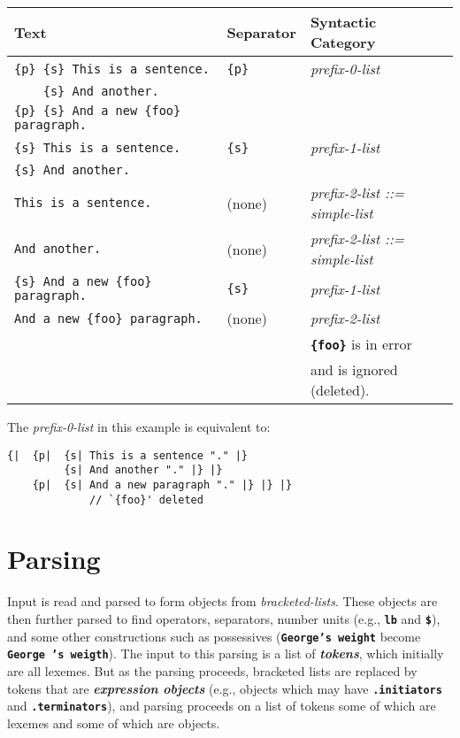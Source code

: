 \documentclass[12pt]{article}
\newcommand{\TT}[1]{{\tt \bfseries #1}}
\newcommand{\skey}[2]{{\bf \em #1#2}\index{#1}}
\newenvironment{indpar}[1][0.3in]%
	{\begin{list}{}%
		     {\setlength{\itemsep}{0in}%
		      \setlength{\topsep}{0in}%
		      \setlength{\parsep}{1ex}%
		      \setlength{\labelwidth}{#1}%
		      \setlength{\leftmargin}{#1}%
		      \addtolength{\leftmargin}{\labelsep}}%
	 \item}%
	{\end{list}}
\begin{document}
\begin{tabular}{lll}
Text	& Separator &  Syntactic Category
\\\hline
\tt \{p\} \{s\} This is a sentence.	& \tt \{p\} & \em prefix-0-list \\
\tt ~~~ \{s\} And another. \\
\tt \{p\} \{s\} And a new \{foo\} paragraph.
\\\hline
\tt \{s\} This is a sentence.	& \tt \{s\} & \em prefix-1-list \\
\tt \{s\} And another.
\\\hline
\tt This is a sentence.	& (none) & \em prefix-2-list  \rm ::= \em simple-list
\\\hline
\tt And another. & (none) & \em prefix-2-list \rm ::= \em simple-list
\\\hline
\tt \{s\} And a new \{foo\} paragraph. & \tt \{s\} & \em prefix-1-list
\\\hline
\tt And a new \{foo\} paragraph. & (none) & \em prefix-2-list \\
			       &        & \TT{\{foo\}} is in error \\
			       &        & and is ignored (deleted).
\end{tabular}

The {\em prefix-0-list} in this example is equivalent to:
\begin{indpar}\begin{verbatim}
{|  {p|  {s| This is a sentence "." |}
         {s| And another "." |} |}
    {p|  {s| And a new paragraph "." |} |} |}
             // `{foo}' deleted
\end{verbatim}\end{indpar}

\section{Parsing}
\label{PARSING}

Input is read and parsed to form objects from {\em bracketed-lists}.
These objects are then further parsed to find operators, separators,
number units (e.g., \TT{lb} and \TT{\$}), and some other constructions
such as possessives (\TT{George's weight} become \TT{George 's weigth}).
The input to this parsing is a list of \skey{token}s, which initially are
all lexemes.  But as the parsing proceeds, bracketed lists are replaced
by tokens that are \skey{expression object}s (e.g., objects which may have
\TT{.initiators} and \TT{.terminators}), and parsing proceeds on 
a list of tokens some of which are lexemes and some of which are objects.
\end{document}
